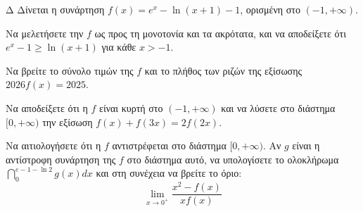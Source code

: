 \begin{thema}{Δ}
Δίνεται η συνάρτηση $\displaystyle f(x) = e^x - \ln(x+1) - 1$, ορισμένη στο $(-1, +\infty)$.
\begin{erwthma}
    \item Να μελετήσετε την $f$ ως προς τη μονοτονία και τα ακρότατα, και να αποδείξετε ότι $e^x - 1 \ge \ln(x+1)$ για κάθε $x > -1$.
    \item Να βρείτε το σύνολο τιμών της $f$ και το πλήθος των ριζών της εξίσωσης $2026 f(x) = 2025$.
    \item Να αποδείξετε ότι η $f$ είναι κυρτή στο $(-1, +\infty)$ και να λύσετε στο διάστημα $[0, +\infty)$ την εξίσωση $f(x) + f(3x) = 2f(2x)$.
    \item Να αιτιολογήσετε ότι η $f$ αντιστρέφεται στο διάστημα $[0, +\infty)$. Αν $g$ είναι η αντίστροφη συνάρτηση της $f$ στο διάστημα αυτό, να υπολογίσετε το ολοκλήρωμα $\displaystyle \dint_0^{e-1-\ln 2} g(x) dx$ και στη συνέχεια να βρείτε το όριο:
    \[ \lim_{x\to 0^+} \frac{x^2 - f(x)}{x f(x)} \]
\end{erwthma}
\end{thema}
